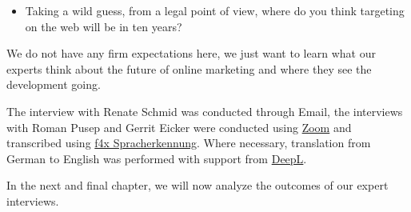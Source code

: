 \begin{itemize} 
 \item Taking a wild guess, from a legal point of view, where do you think targeting on the web will be in ten years?
\end{itemize}

We do not have any firm expectations here, we just want to learn what our experts think about the future of online marketing and where they see the development going.

The interview with Renate Schmid was conducted through Email, the interviews with Roman Pusep and Gerrit Eicker were conducted using \href{https://zoom.us/}{Zoom} and transcribed using \href{https://f4x.audiotranskription.de/}{f4x Spracherkennung}. Where necessary, translation from German to English was performed with support from \href{https://www.deepl.com/en/translator}{DeepL}.

In the next and final chapter, we will now analyze the outcomes of our expert interviews.

